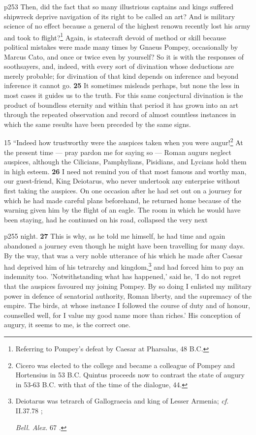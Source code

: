 p253
Then, did the fact that so many illustrious captains and kings suffered shipwreck deprive navigation of its right to be called an art? And is military science of no effect because a general of the highest renown recently lost his army and took to flight?\texthebrew{}\footnote{Referring to Pompey's defeat by Caesar at Pharsalus, 48 B.C.

} Again, is statecraft devoid of method or skill because political mistakes were made many times by Gnaeus Pompey, occasionally by Marcus Cato, and once or twice even by yourself? So it is with the responses of soothsayers, and, indeed, with every sort of divination whose deductions are merely probable; for divination of that kind depends on inference and beyond inference it cannot go. \textbf{25} It sometimes misleads perhaps, but none the less in most cases it guides us to the truth. For this same conjectural divination is the product of boundless eternity and within that period it has grown into an art through the repeated observation and record of almost countless instances in which the same results have been preceded by the same signs.

15
``Indeed how trustworthy were the auspices taken when you were augur!\texthebrew{}\footnote{Cicero was elected to the college and became a colleague of Pompey and Hortensius in 53 B.C. Quintus proceeds now to contrast the state of augury in 53\texthebrew{‑}63 B.C. with that of the time of the dialogue, 44.

} At the present time \texthebrew{—} pray pardon me for saying so \texthebrew{—} Roman augurs neglect auspices, although the Cilicians, Pamphylians, Pisidians, and Lycians hold them in high esteem. \textbf{26} I need not remind you of that most famous and worthy man, our guest-friend, King Deiotarus, who never undertook any enterprise without first taking the auspices. On one occasion after he had set out on a journey for which he had made careful plans beforehand, he returned home because of the warning given him by the flight of an eagle. The room in which he would have been staying, had he continued on his road, collapsed the very next

p255 night. \textbf{27} This is why, as he told me himself, he had time and again abandoned a journey even though he might have been travelling for many days. By the way, that was a very noble utterance of his which he made after Caesar had deprived him of his tetrarchy and kingdom,\texthebrew{}\footnote{Deiotarus was tetrarch of Gallograecia and king of Lesser Armenia; \emph{cf.}
II.37.78 ;

\emph{Bell. Alex.} 67 .

} and had forced him to pay an indemnity too. 'Notwithstanding what has happened,' said he, 'I do not regret that the auspices favoured my joining Pompey. By so doing I enlisted my military power in defence of senatorial authority, Roman liberty, and the supremacy of the empire. The birds, at whose instance I followed the course of duty and of honour, counselled well, for I value my good name more than riches.' His conception of augury, it seems to me, is the correct one.

